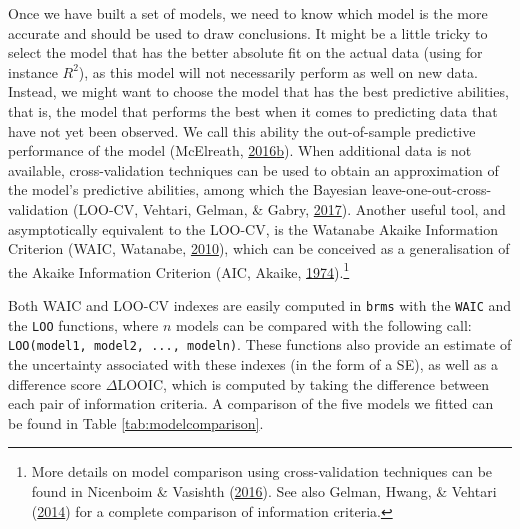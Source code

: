 \documentclass[a4paper,12pt,twoside,onecolumn,openright,final,oldfontcommands]{memoir}
\let\rmarkdownfootnote\footnote%
\def\footnote{\protect\rmarkdownfootnote}
\begin{document}
Once we have built a set of models, we need to know which model is the more accurate and should be used to draw conclusions. It might be a little tricky to select the model that has the better absolute fit on the actual data (using for instance \(R^{2}\)), as this model will not necessarily perform as well on new data. Instead, we might want to choose the model that has the best predictive abilities, that is, the model that performs the best when it comes to predicting data that have not yet been observed. We call this ability the out-of-sample predictive performance of the model (McElreath, \protect\hyperlink{ref-mcelreath_statistical_2016}{2016}\protect\hyperlink{ref-mcelreath_statistical_2016}{b}). When additional data is not available, cross-validation techniques can be used to obtain an approximation of the model's predictive abilities, among which the Bayesian leave-one-out-cross-validation (LOO-CV, Vehtari, Gelman, \& Gabry, \protect\hyperlink{ref-vehtari_practical_2017}{2017}). Another useful tool, and asymptotically equivalent to the LOO-CV, is the Watanabe Akaike Information Criterion (WAIC, Watanabe, \protect\hyperlink{ref-watanabe_asymptotic_2010}{2010}), which can be conceived as a generalisation of the Akaike Information Criterion (AIC, Akaike, \protect\hyperlink{ref-akaike_new_1974}{1974}).\footnote{More details on model comparison using cross-validation techniques can be found in Nicenboim \& Vasishth (\protect\hyperlink{ref-nicenboim_statistical_2016}{2016}). See also Gelman, Hwang, \& Vehtari (\protect\hyperlink{ref-gelman_understanding_2014}{2014}) for a complete comparison of information criteria.}

Both WAIC and LOO-CV indexes are easily computed in \texttt{brms} with the \texttt{WAIC} and the \texttt{LOO} functions, where \(n\) models can be compared with the following call: \texttt{LOO(model1,\ model2,\ ...,\ modeln)}. These functions also provide an estimate of the uncertainty associated with these indexes (in the form of a SE), as well as a difference score \(\Delta \text{LOOIC}\), which is computed by taking the difference between each pair of information criteria. A comparison of the five models we fitted can be found in Table \ref{tab:modelcomparison}.
\end{document}
